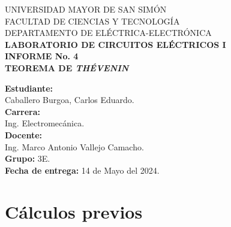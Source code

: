\documentclass[letter,11pt]{article}
\begin{document}
\begin{titlepage}
    \begin{center}
        {\Large UNIVERSIDAD MAYOR DE SAN SIMÓN}\\
        \vspace*{0.15cm}
        {\large FACULTAD DE CIENCIAS Y TECNOLOGÍA}\\
        \vspace*{0.10cm}
        DEPARTAMENTO DE ELÉCTRICA-ELECTRÓNICA\\
        \vspace*{3.0cm}
        {\Large \textbf{LABORATORIO DE CIRCUITOS ELÉCTRICOS I}}\\
        \vspace*{0.3cm}
        {\Large \textbf{INFORME No. 4}}\\
        \vspace*{3.5cm}
        {\Large \textbf{TEOREMA DE \emph{THÉVENIN}}}\\
    \end{center}

    \vspace*{6.4cm}
    \leftskip=7.95cm
    \noindent
    \textbf{Estudiante:}\\
    Caballero Burgoa, Carlos Eduardo.\\
    \newline
    \textbf{Carrera:}\\
    Ing. Electromecánica.\\
    \newline
    \textbf{Docente:}\\
    Ing. Marco Antonio Vallejo Camacho.\\
    \newline
    \textbf{Grupo:} 3E.\\
    \textbf{Fecha de entrega:} 14 de Mayo del 2024.\\
\end{titlepage}

\section{Cálculos previos}
\end{document}
